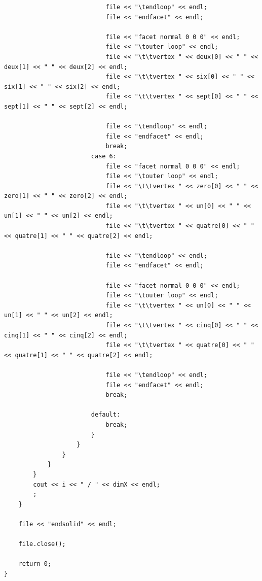 \documentclass{article}
\begin{document}
\begin{lstlisting}
                            file << "\tendloop" << endl;
                            file << "endfacet" << endl;

                            file << "facet normal 0 0 0" << endl;
                            file << "\touter loop" << endl;
                            file << "\t\tvertex " << deux[0] << " " << deux[1] << " " << deux[2] << endl;
                            file << "\t\tvertex " << six[0] << " " << six[1] << " " << six[2] << endl;
                            file << "\t\tvertex " << sept[0] << " " << sept[1] << " " << sept[2] << endl;

                            file << "\tendloop" << endl;
                            file << "endfacet" << endl;
                            break;
                        case 6:
                            file << "facet normal 0 0 0" << endl;
                            file << "\touter loop" << endl;
                            file << "\t\tvertex " << zero[0] << " " << zero[1] << " " << zero[2] << endl;
                            file << "\t\tvertex " << un[0] << " " << un[1] << " " << un[2] << endl;
                            file << "\t\tvertex " << quatre[0] << " " << quatre[1] << " " << quatre[2] << endl;

                            file << "\tendloop" << endl;
                            file << "endfacet" << endl;

                            file << "facet normal 0 0 0" << endl;
                            file << "\touter loop" << endl;
                            file << "\t\tvertex " << un[0] << " " << un[1] << " " << un[2] << endl;
                            file << "\t\tvertex " << cinq[0] << " " << cinq[1] << " " << cinq[2] << endl;
                            file << "\t\tvertex " << quatre[0] << " " << quatre[1] << " " << quatre[2] << endl;

                            file << "\tendloop" << endl;
                            file << "endfacet" << endl;
                            break;

                        default:
                            break;
                        }
                    }
                }
            }
        }
        cout << i << " / " << dimX << endl;
        ;
    }

    file << "endsolid" << endl;

    file.close();

    return 0;
}

\end{lstlisting}
\end{document}
